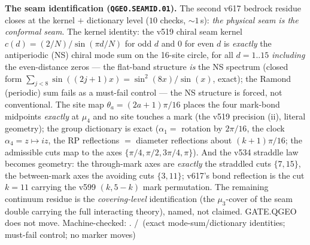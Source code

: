 \documentclass[11pt,a4paper]{article}
\theoremstyle{definition}
\begin{document}
\par\smallskip\noindent\textbf{The seam identification
(\texttt{QGEO.SEAMID.01}).}
The second v617 bedrock residue closes at the kernel $+$ dictionary
level ($10$ checks, ${\sim}1$\,s): \emph{the physical seam is the
conformal seam}.  The kernel identity: the v519 chiral seam kernel
$c(d)=(2/N)/\sin(\pi d/N)$ for odd $d$ and $0$ for even $d$ is
\emph{exactly} the antiperiodic (NS) chiral mode sum on the 16-site
circle, for all $d=1..15$ \emph{including} the even-distance zeros
--- the flat-band structure \emph{is} the NS spectrum (closed form
$\sum_{j<8}\sin((2j{+}1)x)=\sin^2(8x)/\sin(x)$, exact); the Ramond
(periodic) sum fails as a must-fail control --- the NS structure is
forced, not conventional.  The site map $\theta_a=(2a{+}1)\pi/16$
places the four mark-bond midpoints \emph{exactly} at $\mu_4$ and no
site touches a mark (the v519 precision (ii), literal geometry); the
group dictionary is exact ($\alpha_1=$ rotation by $2\pi/16$, the
clock $\alpha_4=z\mapsto iz$, the RP reflections $=$ diameter
reflections about $(k{+}1)\pi/16$; the admissible cuts map to the
axes $\{\pi/4,\pi/2,3\pi/4,\pi\}$).  And the v534 straddle law
becomes geometry: the through-mark axes are \emph{exactly} the
straddled cuts $\{7,15\}$, the between-mark axes the avoiding cuts
$\{3,11\}$; v617's bond reflection is the cut $k=11$ carrying the
v599 $(k,5{-}k)$ mark permutation.  The remaining continuum residue
is the \emph{covering-level} identification (the $\mu_3$-cover of
the seam double carrying the full interacting theory), named, not
claimed.  GATE.QGEO does not move.
Machine-checked: .
\mE/\mC\ (exact mode-sum/dictionary identities; must-fail control;
no marker moves)
\par\smallskip
\end{document}
